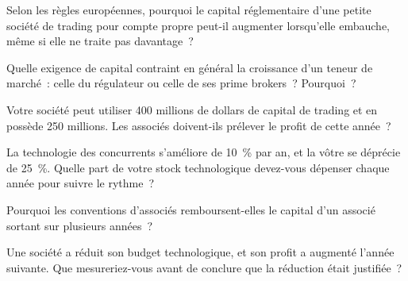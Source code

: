 \begin{interviewq}\label{iq:fm:the-proprietary-market-making-firm:1}
Selon les règles européennes, pourquoi le capital réglementaire d'une petite société de trading pour compte propre peut-il augmenter lorsqu'elle embauche, même si elle ne traite pas davantage~?
\end{interviewq}

\begin{interviewq}\label{iq:fm:the-proprietary-market-making-firm:2}
Quelle exigence de capital contraint en général la croissance d'un teneur de marché~: celle du régulateur ou celle de ses prime brokers~? Pourquoi~?
\end{interviewq}

\begin{interviewq}\label{iq:fm:the-proprietary-market-making-firm:3}
Votre société peut utiliser 400 millions de dollars de capital de trading et en possède 250 millions. Les associés doivent-ils prélever le profit de cette année~?
\end{interviewq}

\begin{interviewq}\label{iq:fm:the-proprietary-market-making-firm:4}
La technologie des concurrents s'améliore de 10~\% par an, et la vôtre se déprécie de 25~\%. Quelle part de votre stock technologique devez-vous dépenser chaque année pour suivre le rythme~?
\end{interviewq}

\begin{interviewq}\label{iq:fm:the-proprietary-market-making-firm:5}
Pourquoi les conventions d'associés remboursent-elles le capital d'un associé sortant sur plusieurs années~?
\end{interviewq}

\begin{interviewq}\label{iq:fm:the-proprietary-market-making-firm:6}
Une société a réduit son budget technologique, et son profit a augmenté l'année suivante. Que mesureriez-vous avant de conclure que la réduction était justifiée~?
\end{interviewq}
